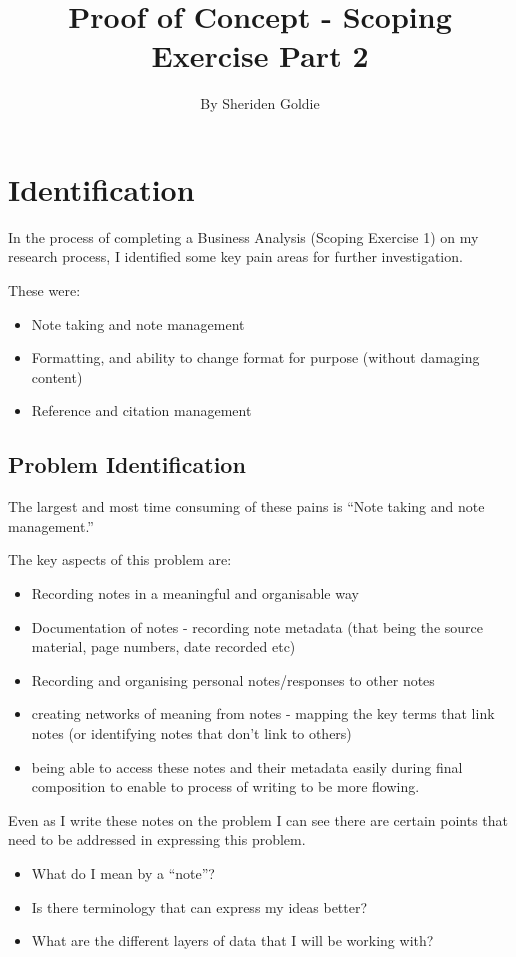 \documentclass{article}
\title{Proof of Concept - Scoping Exercise Part 2}
\author{By Sheriden Goldie}
\date{}
\begin{document}
\maketitle

\tableofcontents

\pagebreak

\section{Identification}
In the process of completing a Business Analysis (Scoping Exercise 1) on my research process, I identified some key pain areas for further investigation.

These were:
\begin{itemize}
    \item Note taking and note management
    \item Formatting, and ability to change format for purpose (without damaging content)
    \item Reference and citation management
\end{itemize}

\subsection{Problem Identification}
The largest and most time consuming of these pains is ``Note taking and note management.''

The key aspects of this problem are:
\begin{itemize}
    \item Recording notes in a meaningful and organisable way
    \item Documentation of notes - recording note metadata (that being the source material, page numbers, date recorded etc)
    \item Recording and organising personal notes/responses to other notes
    \item creating networks of meaning from notes - mapping the key terms that link notes (or identifying notes that don't link to others)
    \item being able to access these notes and their metadata easily during final composition to enable to process of writing to be more flowing.
\end{itemize}

Even as I write these notes on the problem I can see there are certain points that need to be addressed in expressing this problem. 
\begin{itemize}
    \item What do I mean by a ``note''?
    \item Is there terminology that can express my ideas better?
    \item What are the different layers of data that I will be working with?
\end{itemize}
\end{document}
